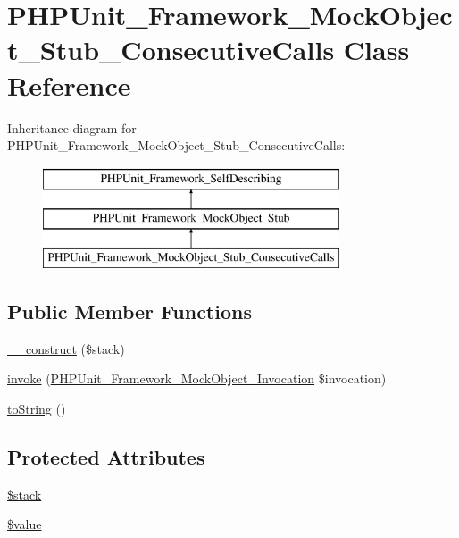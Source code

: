 \hypertarget{class_p_h_p_unit___framework___mock_object___stub___consecutive_calls}{}\section{P\+H\+P\+Unit\+\_\+\+Framework\+\_\+\+Mock\+Object\+\_\+\+Stub\+\_\+\+Consecutive\+Calls Class Reference}
\label{class_p_h_p_unit___framework___mock_object___stub___consecutive_calls}
Inheritance diagram for P\+H\+P\+Unit\+\_\+\+Framework\+\_\+\+Mock\+Object\+\_\+\+Stub\+\_\+\+Consecutive\+Calls\+:\begin{figure}[H]
\begin{center}
\leavevmode
\includegraphics[height=3.000000cm]{class_p_h_p_unit___framework___mock_object___stub___consecutive_calls}
\end{center}
\end{figure}
\subsection*{Public Member Functions}
\begin{DoxyCompactItemize}
\item 
\mbox{\hyperlink{class_p_h_p_unit___framework___mock_object___stub___consecutive_calls_aba9fae69e1f24410bf7d5273f4ae5f69}{\+\_\+\+\_\+construct}} (\$stack)
\item 
\mbox{\hyperlink{class_p_h_p_unit___framework___mock_object___stub___consecutive_calls_af2fc26e6704e08d95f2ea1d9c5ffb865}{invoke}} (\mbox{\hyperlink{interface_p_h_p_unit___framework___mock_object___invocation}{P\+H\+P\+Unit\+\_\+\+Framework\+\_\+\+Mock\+Object\+\_\+\+Invocation}} \$invocation)
\item 
\mbox{\hyperlink{class_p_h_p_unit___framework___mock_object___stub___consecutive_calls_a5558c5d549f41597377fa1ea8a1cefa3}{to\+String}} ()
\end{DoxyCompactItemize}
\subsection*{Protected Attributes}
\begin{DoxyCompactItemize}
\item 
\mbox{\hyperlink{class_p_h_p_unit___framework___mock_object___stub___consecutive_calls_a6a0169b26b5301f906b1ec481b3f1eea}{\$stack}}
\item 
\mbox{\hyperlink{class_p_h_p_unit___framework___mock_object___stub___consecutive_calls_a0f298096f322952a72a50f98a74c7b60}{\$value}}
\end{DoxyCompactItemize}


